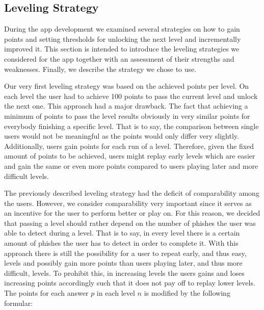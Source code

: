 \subsection{Leveling Strategy}
\label{s:leveling}
During the app development we examined several strategies on how to gain points and setting thresholds for unlocking the next level and incrementally improved it.
 This section is intended to introduce the leveling strategies we considered for the app together with an assessment of their strengths and weaknesses.
Finally, we describe the strategy we chose to use.

\begin{description}[leftmargin=0cm]
	\item[Leveling Based on Achieved Points:] Our very first leveling strategy was based on the achieved points per level.
 On each level the user had to achieve 100 points to pass the current level and unlock the next one.
 This approach had a major drawback.
 The fact that achieving a minimum of points to pass the level results obviously in very similar points for everybody finishing a specific level.
 That is to say, the comparison between single users would not be meaningful as the points would only differ very slightly.
 Additionally, users gain points for each run of a level. Therefore, given the fixed amount of points to be achieved, users might replay early levels which are easier and gain the same or even more points compared to users playing later and more difficult levels.
	\item[Leveling Based on Detected Phishes:] The previously described leveling strategy had the deficit of comparability among the users.
 However, we consider comparability very important  since it serves as an incentive for the user to perform better or play on.
 For this reason, we decided that passing a level should rather depend on the number of phishes the user was able to detect during a level.
 That is to say, in every level there is a certain amount of phishes the user has to detect in order to complete it.
 With this approach there is still the possibility for a user to repeat early, and thus easy, levels and possibly gain more points than users playing later, and thus more difficult, levels.
 To prohibit this, in increasing levels the users gains and loses increasing points accordingly such that it does not pay off to replay lower levels.
 The points for each answer $p$ in each level $n$ is modified by the following formular:

\end{description}
